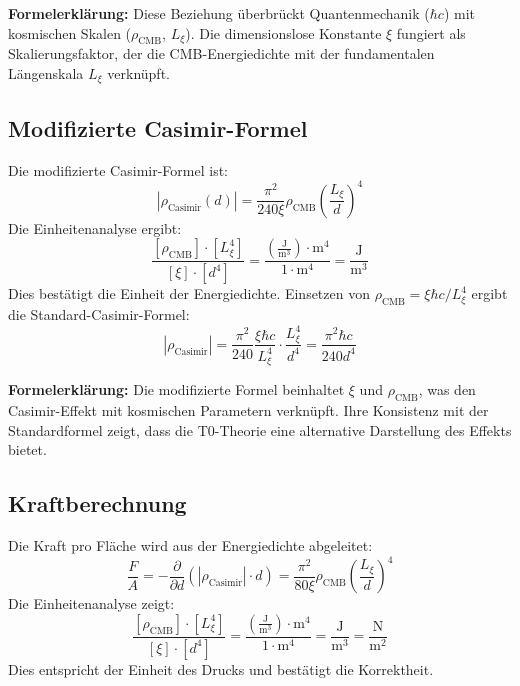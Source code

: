 	\textbf{Formelerklärung:} Diese Beziehung überbrückt Quantenmechanik ($\hbar c$) mit kosmischen Skalen ($\rho_{\text{CMB}}$, $L_\xi$). Die dimensionslose Konstante $\xi$ fungiert als Skalierungsfaktor, der die CMB-Energiedichte mit der fundamentalen Längenskala $L_\xi$ verknüpft.
	
	\subsection{Modifizierte Casimir-Formel}
	Die modifizierte Casimir-Formel ist:
	\begin{equation}
		|\rho_{\text{Casimir}}(d)| = \frac{\pi^2}{240 \xi} \rho_{\text{CMB}} \left( \frac{L_\xi}{d} \right)^4
	\end{equation}
	Die Einheitenanalyse ergibt:
	\begin{equation}
		\frac{[\rho_{\text{CMB}}] \cdot [L_\xi^4]}{[\xi] \cdot [d^4]} = \frac{\left( \frac{\text{J}}{\text{m}^3} \right) \cdot \text{m}^4}{1 \cdot \text{m}^4} = \frac{\text{J}}{\text{m}^3}
	\end{equation}
	Dies bestätigt die Einheit der Energiedichte. Einsetzen von $\rho_{\text{CMB}} = \xi \hbar c / L_\xi^4$ ergibt die Standard-Casimir-Formel:
	\begin{equation}
		|\rho_{\text{Casimir}}| = \frac{\pi^2}{240} \frac{\xi \hbar c}{L_\xi^4} \cdot \frac{L_\xi^4}{d^4} = \frac{\pi^2 \hbar c}{240 d^4}
	\end{equation}
	
	\textbf{Formelerklärung:} Die modifizierte Formel beinhaltet $\xi$ und $\rho_{\text{CMB}}$, was den Casimir-Effekt mit kosmischen Parametern verknüpft. Ihre Konsistenz mit der Standardformel zeigt, dass die T0-Theorie eine alternative Darstellung des Effekts bietet.
	
	\subsection{Kraftberechnung}
	Die Kraft pro Fläche wird aus der Energiedichte abgeleitet:
	\begin{equation}
		\frac{F}{A} = -\frac{\partial}{\partial d} \left( |\rho_{\text{Casimir}}| \cdot d \right) = \frac{\pi^2}{80 \xi} \rho_{\text{CMB}} \left( \frac{L_\xi}{d} \right)^4
	\end{equation}
	Die Einheitenanalyse zeigt:
	\begin{equation}
		\frac{[\rho_{\text{CMB}}] \cdot [L_\xi^4]}{[\xi] \cdot [d^4]} = \frac{\left( \frac{\text{J}}{\text{m}^3} \right) \cdot \text{m}^4}{1 \cdot \text{m}^4} = \frac{\text{J}}{\text{m}^3} = \frac{\text{N}}{\text{m}^2}
	\end{equation}
	Dies entspricht der Einheit des Drucks und bestätigt die Korrektheit.
	
